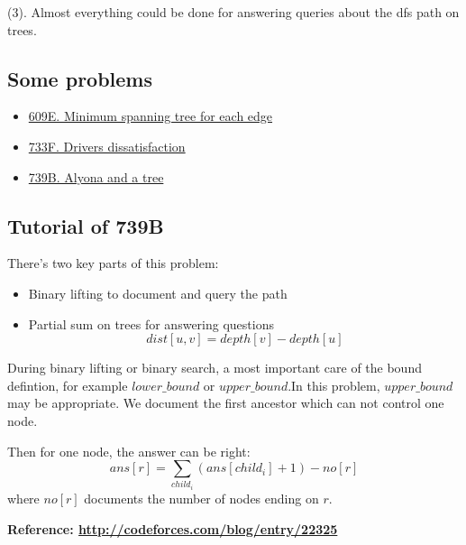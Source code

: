 \documentclass[a4 paper]{article}
\begin{document}
(3). Almost everything could be done for answering queries about the dfs path on trees.


\subsection*{Some problems}
\begin{itemize}
	\item \href{http://codeforces.com/problemset/problem/609/E}{609E. Minimum spanning tree for each edge}
	\item \href{http://codeforces.com/contest/733/problem/F}{733F. Drivers dissatisfaction}
	\item \href{http://codeforces.com/problemset/problem/739/B}{739B. Alyona and a tree}
\end{itemize}

\newpage
\subsection*{Tutorial of 739B}
There's two key parts of this problem:
\begin{itemize}
	\item Binary lifting to document and query the path
	\item Partial sum on trees for answering questions
		\[ dist[u,v] = depth[v]-depth[u] \]
\end{itemize}

During binary lifting or binary search, a most important care of the bound defintion, for example $lower\_bound$ or $upper\_bound$.In this problem, $upper\_bound$ may be appropriate. We document the first ancestor which can not control one node.

Then for one node, the answer can be right:
\[ ans[r]=\sum_{child_i}(ans[child_i]+1)-no[r] \]
where $no[r]$ documents the number of nodes ending on $r$.

\vspace{20pt}

\bf Reference: \url{http://codeforces.com/blog/entry/22325}
\end{document}

